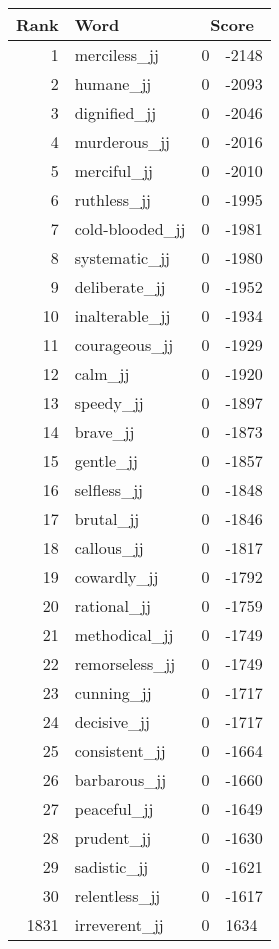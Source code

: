 \begin{longtable}[!htbp]{| rlr@{.}l |}
    \hline
    \textbf{Rank} & \textbf{Word} & \multicolumn{2}{c|}{\textbf{Score}} \\
    \hline
    \endhead
    1 & merciless\_jj & 0 & -2148 \\
    2 & humane\_jj & 0 & -2093 \\
    3 & dignified\_jj & 0 & -2046 \\
    4 & murderous\_jj & 0 & -2016 \\
    5 & merciful\_jj & 0 & -2010 \\
    6 & ruthless\_jj & 0 & -1995 \\
    7 & cold-blooded\_jj & 0 & -1981 \\
    8 & systematic\_jj & 0 & -1980 \\
    9 & deliberate\_jj & 0 & -1952 \\
    10 & inalterable\_jj & 0 & -1934 \\
    11 & courageous\_jj & 0 & -1929 \\
    12 & calm\_jj & 0 & -1920 \\
    13 & speedy\_jj & 0 & -1897 \\
    14 & brave\_jj & 0 & -1873 \\
    15 & gentle\_jj & 0 & -1857 \\
    16 & selfless\_jj & 0 & -1848 \\
    17 & brutal\_jj & 0 & -1846 \\
    18 & callous\_jj & 0 & -1817 \\
    19 & cowardly\_jj & 0 & -1792 \\
    20 & rational\_jj & 0 & -1759 \\
    21 & methodical\_jj & 0 & -1749 \\
    22 & remorseless\_jj & 0 & -1749 \\
    23 & cunning\_jj & 0 & -1717 \\
    24 & decisive\_jj & 0 & -1717 \\
    25 & consistent\_jj & 0 & -1664 \\
    26 & barbarous\_jj & 0 & -1660 \\
    27 & peaceful\_jj & 0 & -1649 \\
    28 & prudent\_jj & 0 & -1630 \\
    29 & sadistic\_jj & 0 & -1621 \\
    30 & relentless\_jj & 0 & -1617 \\
    1831 & irreverent\_jj & 0 & 1634 \\

\end{longtable}
